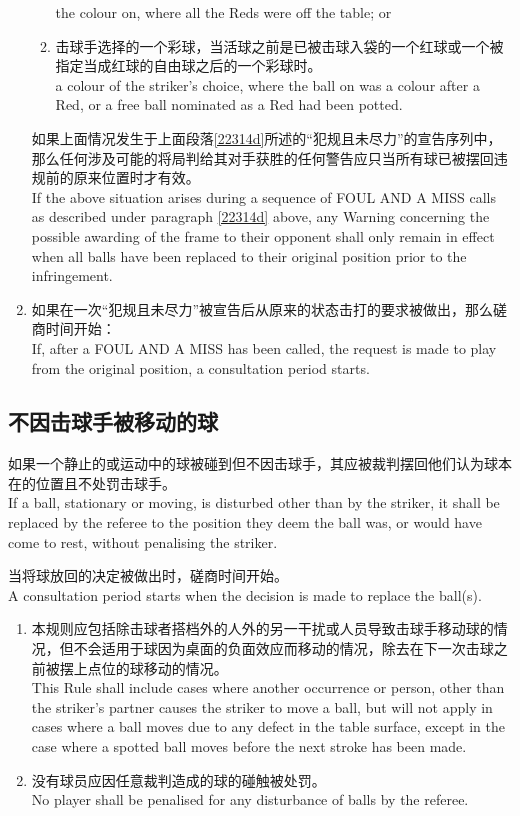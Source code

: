 \begin{enumerate}[label=(\alph*)]
\begin{enumerate}[label=(\roman*)]
        the colour on, where all the Reds were off the table; or
        \item 击球手选择的一个彩球，当活球之前是已被击球入袋的一个红球或一个被指定当成红球的自由球之后的一个彩球时。\\
        a colour of the striker's choice, where the ball on was a colour after a Red, or a free ball nominated as a Red had been potted.
    \end{enumerate}
    如果上面情况发生于上面段落\ref{22314d}所述的``犯规且未尽力''的宣告序列中，那么任何涉及可能的将局判给其对手获胜的任何警告应只当所有球已被摆回违规前的原来位置时才有效。\\
    If the above situation arises during a sequence of FOUL AND A MISS calls as described under paragraph \ref{22314d} above, any Warning concerning the possible awarding of the frame to their opponent shall only remain in effect when all balls have been replaced to their original position prior to the infringement.
    \item 如果在一次``犯规且未尽力''被宣告后从原来的状态击打的要求被做出，那么磋商时间开始：\\
    If, after a FOUL AND A MISS has been called, the request is made to play from the original position, a consultation period starts.
\end{enumerate}

\subsection{不因击球手被移动的球}\label{22315}

\noindent 如果一个静止的或运动中的球被碰到但不因击球手，其应被裁判摆回他们认为球本在的位置且不处罚击球手。\\
If a ball, stationary or moving, is disturbed other than by 
the striker, it shall be replaced by the referee to the position 
they deem the ball was, or would have come to rest, without 
penalising the striker.

\noindent 当将球放回的决定被做出时，磋商时间开始。\\
A consultation period starts when the decision is made to replace the ball(s).
\begin{enumerate}[label=(\alph*)]
    \item 本规则应包括除击球者搭档外的人外的另一干扰或人员导致击球手移动球的情况，但不会适用于球因为桌面的负面效应而移动的情况，除去在下一次击球之前被摆上点位的球移动的情况。\\
    This Rule shall include cases where another occurrence or person, other than the striker's partner causes the striker to move a ball, but will not apply in cases where a ball moves due to any defect in the table surface, except in the case where a spotted ball moves before the next stroke has been made.
    \item 没有球员应因任意裁判造成的球的碰触被处罚。\\
    No player shall be penalised for any disturbance of balls by the referee.
\end{enumerate}

